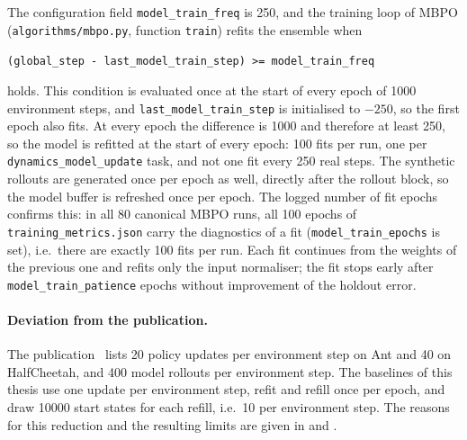 The configuration field \texttt{model\_\allowbreak train\_\allowbreak freq} is \num{250}, and the training loop of MBPO (\texttt{algorithms/\allowbreak mbpo.py}, function \texttt{train}) refits the ensemble when
\begin{center}
  \footnotesize\texttt{(global\_\allowbreak step - last\_\allowbreak model\_\allowbreak train\_\allowbreak step) >= model\_\allowbreak train\_\allowbreak freq}
\end{center}
holds.
This condition is evaluated once at the start of every epoch of \num{1000} environment steps, and \texttt{last\_\allowbreak model\_\allowbreak train\_\allowbreak step} is initialised to $-250$, so the first epoch also fits.
At every epoch the difference is \num{1000} and therefore at least \num{250}, so the model is refitted at the start of every epoch: \num{100} fits per run, one per \texttt{dynamics\_\allowbreak model\_\allowbreak update} task, and not one fit every \num{250} real steps.
The synthetic rollouts are generated once per epoch as well, directly after the rollout block, so the model buffer is refreshed once per epoch.
The logged number of fit epochs confirms this: in all \num{80} canonical MBPO runs, all \num{100} epochs of \texttt{training\_\allowbreak metrics.json} carry the diagnostics of a fit (\texttt{model\_\allowbreak train\_\allowbreak epochs} is set), i.e.\ there are exactly \num{100} fits per run.
Each fit continues from the weights of the previous one and refits only the input normaliser; the fit stops early after \texttt{model\_\allowbreak train\_\allowbreak patience} epochs without improvement of the holdout error.

\paragraph{Deviation from the publication.} The publication~\cite{janner2019mbpo} lists \num{20} policy updates per environment step on Ant and \num{40} on HalfCheetah, and \num{400} model rollouts per environment step.
The baselines of this thesis use one update per environment step, refit and refill once per epoch, and draw \num{10000} start states for each refill, i.e.\ \num{10} per environment step.
The reasons for this reduction and the resulting limits are given in  and .

